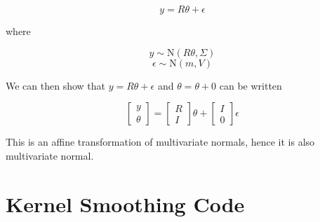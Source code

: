 \documentclass[10pt]{article}
\begin{document}
\begin{enumerate}[label=(\Alph*)]
        $$y = R \theta + \epsilon$$

        where

        $$y \sim \text{N}(R\theta, \Sigma)$$
        $$\epsilon \sim \text{N}(m, V)$$

        We can then show that $y = R \theta + \epsilon$ and $\theta = \theta + 0$ can be written

        $$\begin{bmatrix} y \\ \theta \end{bmatrix} = \begin{bmatrix} R \\ I \end{bmatrix} \theta + \begin{bmatrix} I \\ 0 \end{bmatrix} \epsilon$$

        This is an affine transformation of multivariate normals, hence it is also multivariate normal.

    \end{enumerate}




    \clearpage
    \appendix
    \section{Kernel Smoothing Code}
\end{document}
